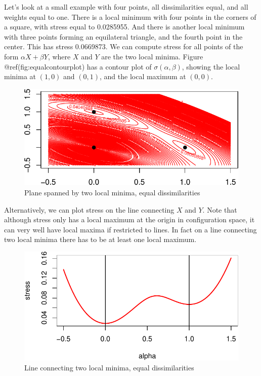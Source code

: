 \documentclass[
  12pt,
  letterpaper,
  DIV=11,
  numbers=noendperiod]{scrreprt}
\theoremstyle{remark}
\begin{document}
Let's look at a small example with four points, all dissimilarities
equal, and all weights equal to one. There is a local minimum with four
points in the corners of a square, with stress equal to 0.0285955. And
there is another local minimum with three points forming an equilateral
triangle, and the fourth point in the center. This has stress 0.0669873.
We can compute stress for all points of the form \(\alpha X+\beta Y\),
where \(X\) and \(Y\) are the two local minima. Figure
@ref(fig:equalcontourplot) has a contour plot of
\(\sigma(\alpha,\beta)\), showing the local minima at \((1,0)\) and
\((0,1)\), and the local maximum at \((0,0)\).

\begin{figure}[H]

{\centering \includegraphics{spaces_files/figure-pdf/equalcontourplot-1.pdf}

}

\caption{Plane spanned by two local minima, equal dissimilarities}

\end{figure}%

Alternatively, we can plot stress on the line connecting \(X\) and
\(Y\). Note that although stress only has a local maximum at the origin
in configuration space, it can very well have local maxima if restricted
to lines. In fact on a line connecting two local minima there has to be
at least one local maximum.

\begin{figure}[H]

{\centering \includegraphics{spaces_files/figure-pdf/equallineplot-1.pdf}

}

\caption{Line connecting two local minima, equal dissimilarities}

\end{figure}%
\end{document}
